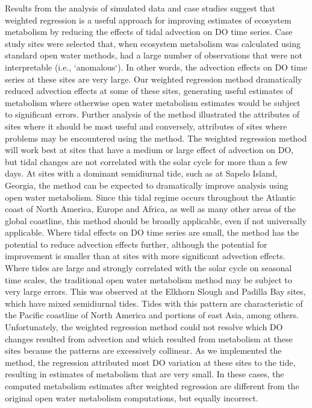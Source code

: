 \documentclass[letterpaper,12pt,oneside]{article}\usepackage[]{graphicx}\usepackage[]{color}
\begin{document}
Results from the analysis of simulated data and case studies suggest that weighted regression is a useful approach for improving estimates of ecosystem metabolism by reducing the effects of tidal advection on \ac{DO} time series.  Case study sites were selected that, when ecosystem metabolism was calculated using standard open water methods, had a large number of observations  that were not interpretable (i.e., `anomalous`).  In other words, the advection effects on \ac{DO} time series at these sites are very large.  Our weighted regression method dramatically reduced advection effects at some of these sites, generating useful estimates of metabolism where otherwise open water metabolism estimates would be subject to significant errors.  Further analysis of the method illustrated the attributes of sites where it should be most useful and conversely, attributes of sites where problems may be encountered using the method.  The weighted regression method will work best at sites that have a medium or large effect of advection on \ac{DO}, but tidal changes are not correlated with the solar cycle for more than a few days.  At sites with a dominant semidiurnal tide, such as at Sapelo Island, Georgia, the method can be expected to dramatically improve analysis using open water metabolism.  Since this tidal regime occurs throughout the Atlantic coast of North America, Europe and Africa, as well as many other areas of the global coastline, this method should be broadly applicable, even if not universally applicable.  Where tidal effects on \ac{DO} time series are small, the method has the potential to reduce advection effects further, although the potential for improvement is smaller than at sites with more significant advection effects.  Where tides are large and strongly correlated with the solar cycle on seasonal time scales, the traditional open water metabolism method may be subject to very large errors.  This was observed at the Elkhorn Slough and Padilla Bay sites, which have mixed semidiurnal tides.  Tides with this pattern are characteristic of the Pacific coastline of North America and portions of east Asia, among others.  Unfortunately, the weighted regression method could not resolve which \ac{DO} changes resulted from advection and which resulted from metabolism at these sites because the patterns are excessively collinear.  As we implemented the method, the regression attributed most \ac{DO} variation at these sites to the tide, resulting in estimates of metabolism that are very small.  In these cases, the computed metabolism estimates after weighted regression are different from the original open water metabolism computations, but equally incorrect.
\end{document}
